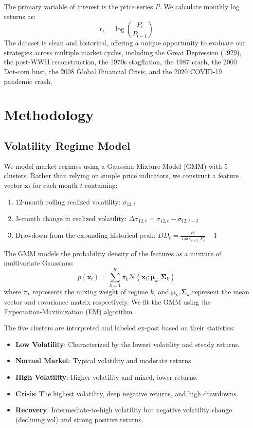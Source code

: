 \documentclass[11pt]{article}
\begin{document}
The primary variable of interest is the price series $P$. We calculate monthly log returns as:
\begin{equation}
r_t = \log\left(\frac{P_t}{P_{t-1}}\right)
\end{equation}
The dataset is clean and historical, offering a unique opportunity to evaluate our strategies across multiple market cycles, including the Great Depression (1929), the post-WWII reconstruction, the 1970s stagflation, the 1987 crash, the 2000 Dot-com bust, the 2008 Global Financial Crisis, and the 2020 COVID-19 pandemic crash.

\section{Methodology}

\subsection{Volatility Regime Model}
We model market regimes using a Gaussian Mixture Model (GMM) with 5 clusters. Rather than relying on simple price indicators, we construct a feature vector $\mathbf{x}_t$ for each month $t$ containing:
\begin{enumerate}
    \item 12-month rolling realized volatility: $\sigma_{12, t}$
    \item 3-month change in realized volatility: $\Delta\sigma_{12, t} = \sigma_{12, t} - \sigma_{12, t-3}$
    \item Drawdown from the expanding historical peak: $DD_t = \frac{P_t}{\max_{s \le t} P_s} - 1$
\end{enumerate}

The GMM models the probability density of the features as a mixture of multivariate Gaussians:
\begin{equation}
p(\mathbf{x}_t) = \sum_{k=1}^{K} \pi_k \mathcal{N}(\mathbf{x}_t; \boldsymbol{\mu}_k, \boldsymbol{\Sigma}_k)
\end{equation}
where $\pi_k$ represents the mixing weight of regime $k$, and $\boldsymbol{\mu}_k, \boldsymbol{\Sigma}_k$ represent the mean vector and covariance matrix respectively. We fit the GMM using the Expectation-Maximization (EM) algorithm \citep{dempster1977}.

The five clusters are interpreted and labeled ex-post based on their statistics:
\begin{itemize}
    \item \textbf{Low Volatility}: Characterized by the lowest volatility and steady returns.
    \item \textbf{Normal Market}: Typical volatility and moderate returns.
    \item \textbf{High Volatility}: Higher volatility and mixed, lower returns.
    \item \textbf{Crisis}: The highest volatility, deep negative returns, and high drawdowns.
    \item \textbf{Recovery}: Intermediate-to-high volatility but negative volatility change (declining vol) and strong positive returns.
\end{itemize}
\end{document}
